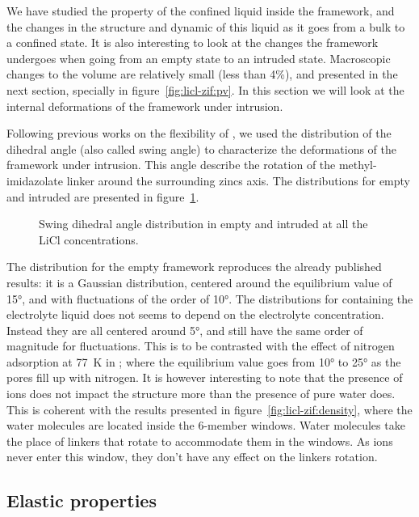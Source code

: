 \documentclass[thesis]{subfiles}
\begin{document}
We have studied the property of the confined liquid inside the  framework,
and the changes in the structure and dynamic of this liquid as it goes from a
bulk to a confined state. It is also interesting to look at the changes the
framework undergoes when going from an empty state to an intruded state.
Macroscopic changes to the volume are relatively small (less than 4\%), and
presented in the next section, specially in figure~\ref{fig:licl-zif:pv}. In this section
we will look at the internal deformations of the framework under intrusion.

Following previous works on the flexibility of \cite{Chaplais2018,
Coudert2017, FairenJimenez2011}, we used the distribution of the
 dihedral angle (also called swing angle) to characterize the
deformations of the framework under intrusion. This angle describe the rotation
of the methyl-imidazolate linker around the surrounding zincs axis. The
distributions for empty and intruded  are presented in
figure~\ref{fig:licl-zif:dihedrals}.

\begin{figure}[ht]
    \centering
    
    \caption{Swing dihedral angle distribution in empty and intruded  at
    all the LiCl concentrations.}
    \label{fig:licl-zif:dihedrals}
\end{figure}

The distribution for the empty framework reproduces the already published
results: it is a Gaussian distribution, centered around the equilibrium value of
15°, and with fluctuations of the order of 10°. The distributions for 
containing the electrolyte liquid does not seems to depend on the electrolyte
concentration. Instead they are all centered around 5°, and still have the same
order of magnitude for fluctuations. This is to be contrasted with the effect of
nitrogen adsorption at \SI{77}{K} in \cite{Chaplais2018}; where the
equilibrium value goes from 10° to 25° as the pores fill up with nitrogen. It is
however interesting to note that the presence of ions does not impact the
structure more than the presence of pure water does. This is coherent with the
results presented in figure~\ref{fig:licl-zif:density}, where the water molecules are
located inside the 6-member windows. Water molecules take the place of linkers
that rotate to accommodate them in the windows. As ions never enter this window,
they don't have any effect on the linkers rotation.

\subsection{Elastic properties}
\end{document}
